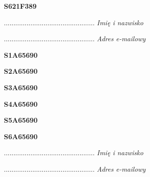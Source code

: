 \begin{turn}{90}\huge \textbf{S621F389}\end{turn}

\begin{turn}{90}\begin{minipage}{\linewidth} \vspace{20mm} ................................................  \textit{Imię i nazwisko}\end{minipage}\end{turn}

\begin{turn}{90}\begin{minipage}{\linewidth} \vspace{20mm} ................................................  \textit{Adres e-mailowy}\end{minipage}\end{turn}

\begin{turn}{90}\huge \textbf{S1A65690}\end{turn}

\begin{turn}{90}\huge \textbf{S2A65690}\end{turn}

\begin{turn}{90}\huge \textbf{S3A65690}\end{turn}

\begin{turn}{90}\huge \textbf{S4A65690}\end{turn}

\begin{turn}{90}\huge \textbf{S5A65690}\end{turn}

\begin{turn}{90}\huge \textbf{S6A65690}\end{turn}

\begin{turn}{90}\begin{minipage}{\linewidth} \vspace{20mm} ................................................  \textit{Imię i nazwisko}\end{minipage}\end{turn}

\begin{turn}{90}\begin{minipage}{\linewidth} \vspace{20mm} ................................................  \textit{Adres e-mailowy}\end{minipage}\end{turn}

